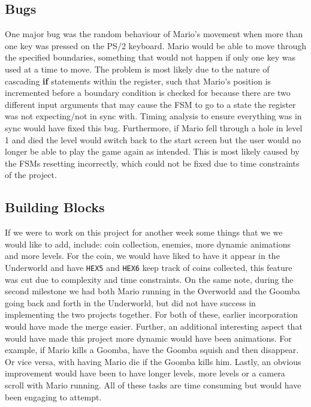 \documentclass[12pt]{article}
\begin{document}
\subsection{Bugs}
One major bug was the random behaviour of Mario's movement when more than one key was pressed on the PS/2 keyboard. Mario would be able to move through the specified boundaries, something that would not happen if only one key was used at a time to move. The problem is most likely due to the nature of cascading \textbf{if} statements within the register, such that Mario's position is incremented before a boundary condition is checked for because there are two different input arguments that may cause the FSM to go to a state the register was not expecting/not in sync with. Timing analysis to ensure everything was in sync would have fixed this bug. Furthermore, if Mario fell through a hole in level 1 and died the level would switch back to the start screen but the user would no longer be able to play the game again as intended. This is most likely caused by the FSMs resetting incorrectly, which could not be fixed due to time constraints of the project. 
\subsection{Building Blocks}
If we were to work on this project for another week some things that we we would like to add, include: coin collection, enemies, more dynamic animations and more levels. For the coin, we would have liked to have it appear in the Underworld and have \texttt{HEX5} and \texttt{HEX6} keep track of coins collected, this feature was cut due to complexity and time constraints. On the same note, during the second milestone we had both Mario running in the Overworld and the Goomba going back and forth in the Underworld, but did not have success in implementing the two projects together. For both of these, earlier incorporation would have made the merge easier. Further, an additional interesting aspect that would have made this project more dynamic would have been animations. For example, if Mario kills a Goomba, have the Goomba squish and then disappear. Or vice versa, with having Mario die if the Goomba kills him. Lastly, an obvious improvement would have been to have longer levels, more levels or a camera scroll with Mario running. All of these tasks are time consuming but would have been engaging to attempt.
\end{document}
